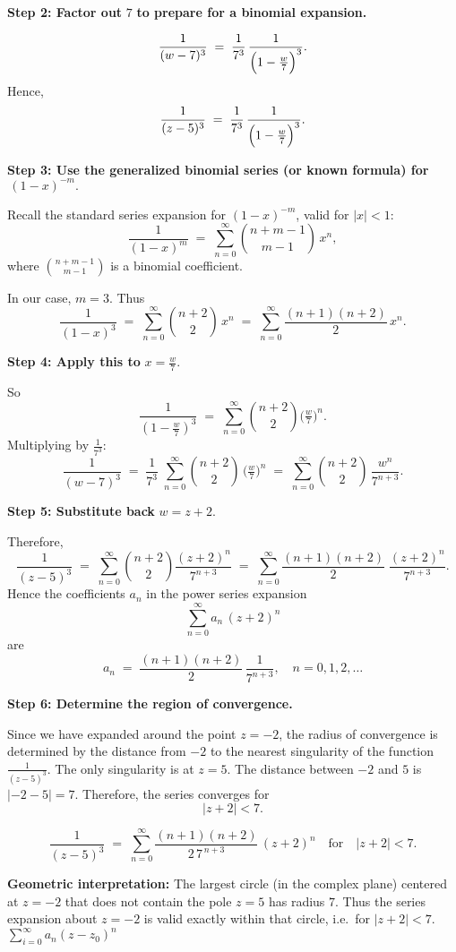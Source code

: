 \documentclass[12pt]{article}
\theoremstyle{definition} %
\theoremstyle{plain} %
\begin{document}
\textbf{Step 2: Factor out } \(7\) \textbf{ to prepare for a binomial expansion.}

\[
\frac{1}{(w - 7)^3}
\;=\;
\frac{1}{7^3}\,\frac{1}{\Bigl(1 - \tfrac{w}{7}\Bigr)^3}.
\]
Hence,
\[
\frac{1}{(z - 5)^3}
\;=\;
\frac{1}{7^3}\,\frac{1}{\Bigl(1 - \tfrac{w}{7}\Bigr)^3}.
\]

\textbf{Step 3: Use the generalized binomial series (or known formula) for } 
\(\,(1 - x)^{-m}.\)

Recall the standard series expansion for \((1 - x)^{-m}\), valid for \(\lvert x\rvert < 1\):
\[
\frac{1}{(1 - x)^m}
\;=\;
\sum_{n=0}^{\infty} \binom{n+m-1}{m-1}\,x^n,
\]
where \(\displaystyle \binom{n+m-1}{m-1}\) is a binomial coefficient. 

In our case, \(m = 3\). Thus
\[
\frac{1}{(1 - x)^3}
\;=\;
\sum_{n=0}^{\infty} \binom{n+2}{2}\, x^n
\;=\;
\sum_{n=0}^{\infty} \frac{(n+1)(n+2)}{2}\, x^n.
\]

\textbf{Step 4: Apply this to } \(x = \tfrac{w}{7}.\)

So
\[
\frac{1}{(1 - \tfrac{w}{7})^3}
\;=\;
\sum_{n=0}^{\infty} \binom{n+2}{2} 
\biggl(\tfrac{w}{7}\biggr)^n.
\]
Multiplying by \(\tfrac{1}{7^3}\):
\[
\frac{1}{(w-7)^3}
\;=\;
\frac{1}{7^3}\;
\sum_{n=0}^{\infty}
\binom{n+2}{2}\,
\biggl(\tfrac{w}{7}\biggr)^n
\;=\;
\sum_{n=0}^{\infty}
\binom{n+2}{2}\,
\frac{w^n}{7^{n+3}}.
\]

\textbf{Step 5: Substitute back } \(w = z + 2.\)

Therefore,
\[
\frac{1}{(z - 5)^3}
\;=\;
\sum_{n=0}^{\infty}
\binom{n+2}{2}
\frac{(z+2)^n}{7^{n+3}}
\;=\;
\sum_{n=0}^{\infty}
\frac{(n+1)(n+2)}{2}\;
\frac{(z+2)^n}{7^{n+3}}.
\]
Hence the coefficients \(a_n\) in the power series expansion
\[
\sum_{n=0}^{\infty} a_n\,(z+2)^n
\]
are
\[
a_n
\;=\;
\frac{(n+1)(n+2)}{2}\,\frac{1}{7^{n+3}},
\quad n=0,1,2,\dots
\]

\textbf{Step 6: Determine the region of convergence.}

Since we have expanded around the point \(z=-2\), the radius of convergence is determined by the distance from \(-2\) to the nearest singularity of the function \(\frac{1}{(z-5)^3}\). The only singularity is at \(z=5\). The distance between \(-2\) and \(5\) is \(\lvert -2 - 5\rvert = 7\). Therefore, the series converges for
\[
\lvert z + 2\rvert < 7.
\]

\[
\boxed{
\frac{1}{(z-5)^3}
\;=\;
\sum_{n=0}^{\infty}
\frac{(n+1)(n+2)}{2\,7^{\,n+3}}\,(z+2)^n
\quad
\text{for}
\quad
\lvert z+2\rvert < 7.
}
\]

\textbf{Geometric interpretation:} The largest circle (in the complex plane) centered at \(z=-2\) that does not contain the pole \(z=5\) has radius \(7\). Thus the series expansion about \(z=-2\) is valid exactly within that circle, i.e.\ for \(\lvert z+2\rvert < 7\).
$\sum_{i=0}^{\infty} a_n(z-z_0)^{n}$ 
\end{document}
